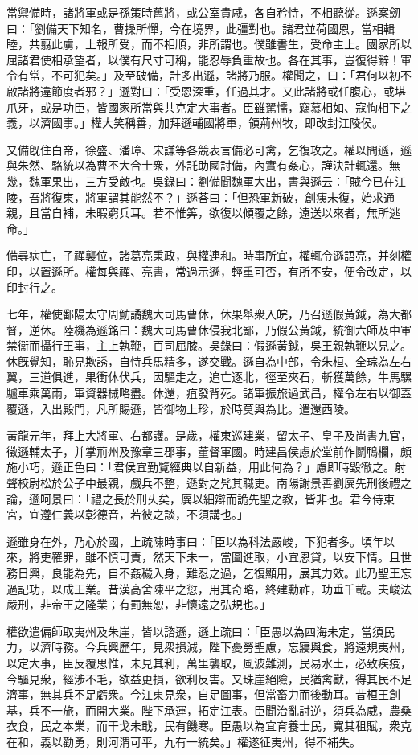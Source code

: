 \begin{pinyinscope}
當禦備時，諸將軍或是孫策時舊將，或公室貴戚，各自矜恃，不相聽從。遜案劒曰：「劉備天下知名，曹操所憚，今在境界，此彊對也。諸君並荷國恩，當相輯睦，共翦此虜，上報所受，而不相順，非所謂也。僕雖書生，受命主上。國家所以屈諸君使相承望者，以僕有尺寸可稱，能忍辱負重故也。各在其事，豈復得辭！軍令有常，不可犯矣。」及至破備，計多出遜，諸將乃服。權聞之，曰：「君何以初不啟諸將違節度者邪？」遜對曰：「受恩深重，任過其才。又此諸將或任腹心，或堪爪牙，或是功臣，皆國家所當與共克定大事者。臣雖駑懦，竊慕相如、寇恂相下之義，以濟國事。」權大笑稱善，加拜遜輔國將軍，領荊州牧，即改封江陵侯。

又備旣住白帝，徐盛、潘璋、宋謙等各競表言備必可禽，乞復攻之。權以問遜，遜與朱然、駱統以為曹丕大合士衆，外託助國討備，內實有姦心，謹決計輒還。無幾，魏軍果出，三方受敵也。吳錄曰：劉備聞魏軍大出，書與遜云：「賊今已在江陵，吾將復東，將軍謂其能然不？」遜荅曰：「但恐軍新破，創痍未復，始求通親，且當自補，未暇窮兵耳。若不惟筭，欲復以傾覆之餘，遠送以來者，無所逃命。」

備尋病亡，子禪襲位，諸葛亮秉政，與權連和。時事所宜，權輒令遜語亮，并刻權印，以置遜所。權每與禪、亮書，常過示遜，輕重可否，有所不安，便令改定，以印封行之。

七年，權使鄱陽太守周魴譎魏大司馬曹休，休果舉衆入皖，乃召遜假黃鉞，為大都督，逆休。陸機為遜銘曰：魏大司馬曹休侵我北鄙，乃假公黃鉞，統御六師及中軍禁衞而攝行王事，主上執鞭，百司屈膝。吳錄曰：假遜黃鉞，吳王親執鞭以見之。休旣覺知，恥見欺誘，自恃兵馬精多，遂交戰。遜自為中部，令朱桓、全琮為左右翼，三道俱進，果衝休伏兵，因驅走之，追亡逐北，徑至夾石，斬獲萬餘，牛馬騾驢車乘萬兩，軍資器械略盡。休還，疽發背死。諸軍振旅過武昌，權令左右以御蓋覆遜，入出殿門，凡所賜遜，皆御物上珍，於時莫與為比。遣還西陵。

黃龍元年，拜上大將軍、右都護。是歲，權東巡建業，留太子、皇子及尚書九官，徵遜輔太子，并掌荊州及豫章三郡事，董督軍國。時建昌侯慮於堂前作鬬鴨欄，頗施小巧，遜正色曰：「君侯宜勤覽經典以自新益，用此何為？」慮即時毀徹之。射聲校尉松於公子中最親，戲兵不整，遜對之髠其職吏。南陽謝景善劉廙先刑後禮之論，遜呵景曰：「禮之長於刑乆矣，廙以細辯而詭先聖之教，皆非也。君今侍東宮，宜遵仁義以彰德音，若彼之談，不須講也。」

遜雖身在外，乃心於國，上疏陳時事曰：「臣以為科法嚴峻，下犯者多。頃年以來，將吏罹罪，雖不慎可責，然天下未一，當圖進取，小宜恩貸，以安下情。且世務日興，良能為先，自不姦穢入身，難忍之過，乞復顯用，展其力效。此乃聖王忘過記功，以成王業。昔漢高舍陳平之愆，用其奇略，終建勳祚，功垂千載。夫峻法嚴刑，非帝王之隆業；有罰無恕，非懷遠之弘規也。」

權欲遣偏師取夷州及朱崖，皆以諮遜，遜上疏曰：「臣愚以為四海未定，當須民力，以濟時務。今兵興歷年，見衆損減，陛下憂勞聖慮，忘寢與食，將遠規夷州，以定大事，臣反覆思惟，未見其利，萬里襲取，風波難測，民易水土，必致疾疫，今驅見衆，經涉不毛，欲益更損，欲利反害。又珠崖絕險，民猶禽獸，得其民不足濟事，無其兵不足虧衆。今江東見衆，自足圖事，但當畜力而後動耳。昔桓王創基，兵不一旅，而開大業。陛下承運，拓定江表。臣聞治亂討逆，須兵為威，農桑衣食，民之本業，而干戈未戢，民有饑寒。臣愚以為宜育養士民，寬其租賦，衆克在和，義以勸勇，則河渭可平，九有一統矣。」權遂征夷州，得不補失。


\end{pinyinscope}
